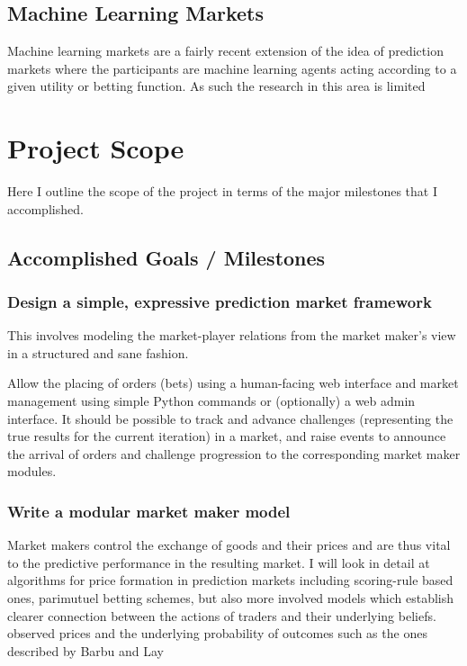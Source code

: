 \documentclass[bsc,frontabs,twoside,singlespacing,parskip,deptreport]{infthesis}     %
\begin{document}
\section{Machine Learning Markets}
	Machine learning markets are a fairly recent extension of the idea of prediction markets where the participants are machine learning agents acting according to a given utility or betting function. As such the research in this area is limited

\chapter{Project Scope}
	Here I outline the scope of the project in terms of the major milestones that I accomplished. 

\section{Accomplished Goals / Milestones}	

\subsection{Design a simple, expressive prediction market framework}
	This involves modeling the market-player relations from the market maker’s view in a structured and sane fashion. 

Allow the placing of orders (bets) using a human-facing web interface and market management using simple Python commands or (optionally) a web admin interface. It should be possible to track and advance challenges (representing the true results for the current iteration) in a market, and raise events to announce the arrival of orders and challenge progression to the corresponding market maker modules. 

\subsection{Write a modular market maker model}

Market makers control the exchange of goods and their prices and are thus vital to the predictive performance in the resulting market. I will look in detail at algorithms for price formation in prediction markets including scoring-rule based ones, parimutuel betting schemes, but also more involved models which establish clearer connection between the actions of traders and their underlying beliefs. observed prices and the underlying probability of outcomes such as the ones described by Barbu and Lay 
\end{document}
